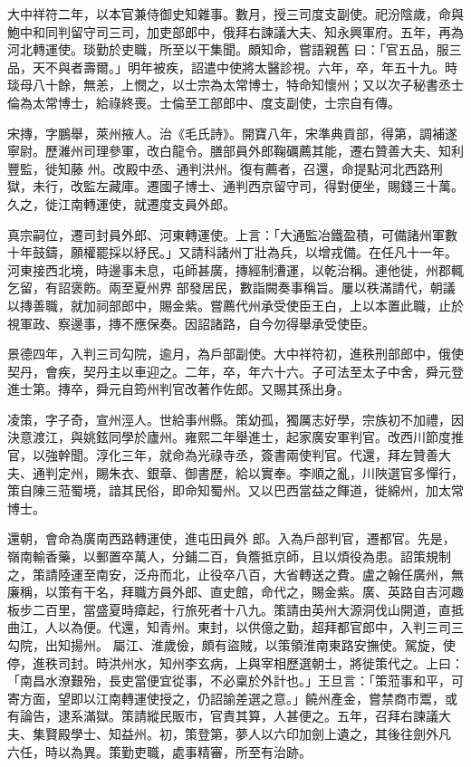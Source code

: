 \begin{pinyinscope}
 大中祥符二年，以本官兼侍御史知雜事。數月，授三司度支副使。祀汾陰歲，命與鮑中和同判留守司三司，加吏部郎中，俄拜右諫議大夫、知永興軍府。五年，再為河北轉運使。琰勤於吏職，所至以干集聞。頗知命，嘗語親舊
 曰：「官五品，服三品，天不與者壽爾。」明年被疾，詔遣中使將太醫診視。六年，卒，年五十九。時琰母八十餘，無恙，上憫之，以士宗為太常博士，特命知懷州；又以次子秘書丞士倫為太常博士，給祿終喪。士倫至工部郎中、度支副使，士宗自有傳。



 宋摶，字鵬舉，萊州掖人。治《毛氏詩》。開寶八年，宋準典貢部，得第，調補遂寧尉。歷濰州司理參軍，改白龍令。膳部員外郎鞠礪薦其能，遷右贊善大夫、知利豐監，徙知藤
 州。改殿中丞、通判洪州。復有薦者，召還，命提點河北西路刑獄，未行，改監左藏庫。遷國子博士、通判西京留守司，得對便坐，賜錢三十萬。久之，徙江南轉運使，就遷度支員外郎。



 真宗嗣位，遷司封員外郎、河東轉運使。上言：「大通監冶鐵盈積，可備諸州軍數十年鼓鑄，願權罷採以紓民。」又請科諸州丁壯為兵，以增戎備。在任凡十一年。河東接西北境，時邊事未息，屯師甚廣，摶經制漕運，以乾治稱。連他徙，州郡輒乞留，有詔褒飭。兩至夏州界
 部發居民，數詣闕奏事稱旨。屢以秩滿請代，朝議以摶善職，就加祠部郎中，賜金紫。嘗薦代州承受使臣王白，上以本置此職，止於視軍政、察邊事，摶不應保奏。因詔諸路，自今勿得舉承受使臣。



 景德四年，入判三司勾院，逾月，為戶部副使。大中祥符初，進秩刑部郎中，俄使契丹，會疾，契丹主以車迎之。二年，卒，年六十六。子可法至太子中舍，舜元登進士第。摶卒，舜元自筠州判官改著作佐郎。又賜其孫出身。



 凌策，字子奇，宣州涇人。世給事州縣。策幼孤，獨厲志好學，宗族初不加禮，因決意渡江，與姚鉉同學於廬州。雍熙二年舉進士，起家廣安軍判官。改西川節度推官，以強幹聞。淳化三年，就命為光祿寺丞，簽書兩使判官。代還，拜左贊善大夫、通判定州，賜朱衣、銀章、御書歷，給以實奉。李順之亂，川陜選官多憚行，策自陳三蒞蜀境，諳其民俗，即命知蜀州。又以巴西當益之餫道，徙綿州，加太常博士。



 還朝，會命為廣南西路轉運使，進屯田員外
 郎。入為戶部判官，遷都官。先是，嶺南輸香藥，以郵置卒萬人，分鋪二百，負簷抵京師，且以煩役為患。詔策規制之，策請陸運至南安，泛舟而北，止役卒八百，大省轉送之費。盧之翰任廣州，無廉稱，以策有干名，拜職方員外郎、直史館，命代之，賜金紫。廣、英路自吉河趣板步二百里，當盛夏時瘴起，行旅死者十八九。策請由英州大源洞伐山開道，直抵曲江，人以為便。代還，知青州。東封，以供億之勤，超拜都官郎中，入判三司三勾院，出知揚州。
 屬江、淮歲儉，頗有盜賊，以策領淮南東路安撫使。駕旋，使停，進秩司封。時洪州水，知州李玄病，上與宰相歷選朝士，將徙策代之。上曰：「南昌水潦艱殆，長吏當便宜從事，不必稟於外計也。」王旦言：「策蒞事和平，可寄方面，望即以江南轉運使授之，仍詔諭差選之意。」饒州產金，嘗禁商市鬻，或有論告，逮系滿獄。策請縱民販市，官責其算，人甚便之。五年，召拜右諫議大夫、集賢殿學士、知益州。初，策登第，夢人以六印加劍上遺之，其後往劍外凡
 六任，時以為異。策勤吏職，處事精審，所至有治跡。




\end{pinyinscope}
